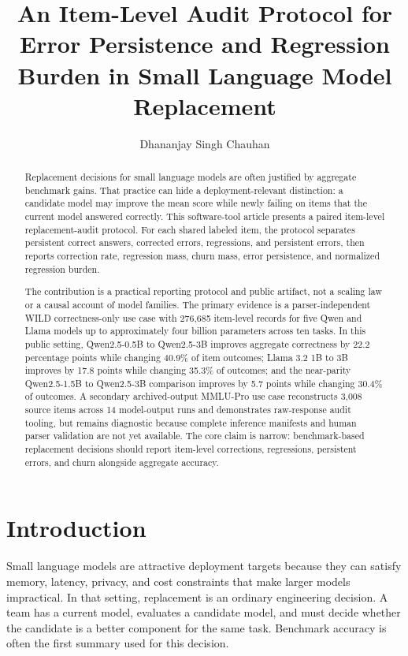 \documentclass[manuscript, screen, review, nonacm]{jair}
\title[Item-Level Replacement Audit]{An Item-Level Audit Protocol for Error Persistence and Regression Burden in Small Language Model Replacement}
\author{Dhananjay Singh Chauhan}
\affiliation{%
  \institution{Independent Reviewer}
}
\begin{document}
\begin{abstract}
Replacement decisions for small language models are often justified by aggregate benchmark gains. That practice can hide a deployment-relevant distinction: a candidate model may improve the mean score while newly failing on items that the current model answered correctly. This software-tool article presents a paired item-level replacement-audit protocol. For each shared labeled item, the protocol separates persistent correct answers, corrected errors, regressions, and persistent errors, then reports correction rate, regression mass, churn mass, error persistence, and normalized regression burden.

The contribution is a practical reporting protocol and public artifact, not a scaling law or a causal account of model families. The primary evidence is a parser-independent WILD correctness-only use case with 276,685 item-level records for five Qwen and Llama models up to approximately four billion parameters across ten tasks. In this public setting, Qwen2.5-0.5B to Qwen2.5-3B improves aggregate correctness by 22.2 percentage points while changing 40.9\% of item outcomes; Llama 3.2 1B to 3B improves by 17.8 points while changing 35.3\% of outcomes; and the near-parity Qwen2.5-1.5B to Qwen2.5-3B comparison improves by 5.7 points while changing 30.4\% of outcomes. A secondary archived-output MMLU-Pro use case reconstructs 3,008 source items across 14 model-output runs and demonstrates raw-response audit tooling, but remains diagnostic because complete inference manifests and human parser validation are not yet available. The core claim is narrow: benchmark-based replacement decisions should report item-level corrections, regressions, persistent errors, and churn alongside aggregate accuracy.
\end{abstract}

\maketitle
\thispagestyle{plain}
\pagestyle{plain}

\section{Introduction}

Small language models are attractive deployment targets because they can satisfy memory, latency, privacy, and cost constraints that make larger models impractical. In that setting, replacement is an ordinary engineering decision. A team has a current model, evaluates a candidate model, and must decide whether the candidate is a better component for the same task. Benchmark accuracy is often the first summary used for this decision.
\end{document}
